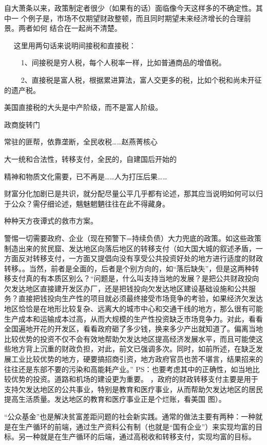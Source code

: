 自大萧条以来，政策制定者很少（如果有的话）面临像今天这样多的不确定性。其中一
个例子是，市场不仅期望财政整顿，而且同时期望未来经济增长的合理前景。两者如何
结合在一起尚不清楚。

　 这里用两句话来说明间接税和直接税：

　　 1、间接税是穷人税，每个人税率一样，比如普通商品的增值税。

　　 2、直接税是富人税，根据累进算法，富人交更多的税，比如个税和尚未开征的遗产税。

美国直接税的大头是中产阶级，而不是富人阶级。


政商旋转门

常驻的匪帮，依靠垄断，全民收税……赵燕菁核心

大一统和合法性，转移支付，全民的，自建国后开始的

精神和物质文化需要，已不再是……人为打压后果……

财富分化加剧已是共识，就分配尽量公平几乎都有论述，那其应当说明如何可以归于公众？需仔细论述，魑魅魍魉往往在此不得藏身。

种种天方夜谭式的救市方案。

警惕一切需要政府、企业（现在预警下=持续负债）大力兜底的政策。如这些政策制造出来的贫民窟、发达地区向落后地区的转移支付（如大国大城的叙述矛盾，一方面反对转移支付，一方面又提倡向没有享受公共投资好处的地方进行适度的财政转移。。当然，前者是全面的，后者是个别方向的，如“落后缺失”，但是这两种转移支付真的有本质区别么？“问题是，什么叫支持当地的发展？是把公共财政投向欠发达地区直接建开发区办厂，还是把钱投向欠发达地区建设基础设施和公共服务？直接把钱投向生产性的项目就必须最终接受市场竞争的考验，如果经济欠发达地区恰恰是在地形比较复杂、远离大的城市中心和交通干线的地方，那么很有可能生产成本和运输成本过高，从而大规模的生产性投资缺乏市场竞争力。对此，看看全国遍地开花的开发区，看看政府砸了多少钱，换来多少产出就知道了。偏离当地比较优势的投资不仅不会有效地帮助欠发达地区提高经济发展水平，而且可能使这些地方背上沉重的财政负担，对此，前文已强调多次。同时，如前所述，在缺乏发展工业比较优势的地方，硬要搞招商引资，地方政府官员也苦不堪言，结果招来的往往还是东部不要的污染和高能耗产业。” PS：也要考虑其中的正确性，如当地比较优势的投资。道路和机场的建设更为重要。 ，政府的财政转移支付主要是用于支持欠发达地区的公共事业，特别是教育和医疗事业，从而帮助欠发达地区的居民提高生活质量。发达地区的教育和医疗事业正是个烂账，看美国 图）。

“公众基金”也是解决贫富差距问题的社会新实践。通常的做法主要有两种：一种就是在生产循环的前端，通过生产资料公有制（也就是“国有企业”）来实现均富的目标。另一种就是在生产循环的后端，通过高税收和转移支付，实现均富的目标。


